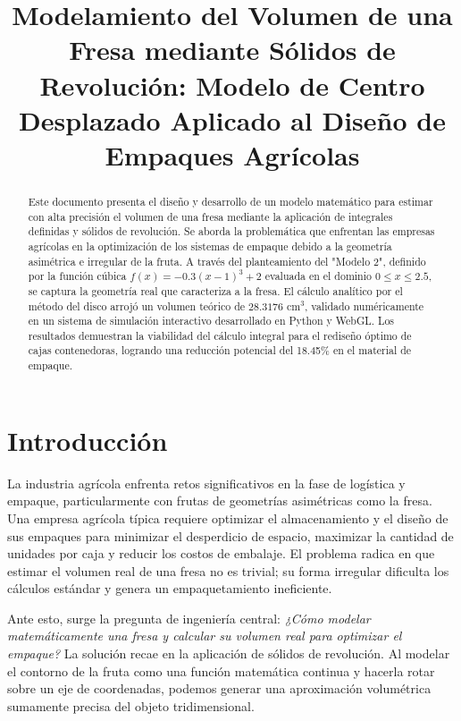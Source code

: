 \documentclass[conference, Spanish]{IEEEtran}
\begin{document}
\title{Modelamiento del Volumen de una Fresa mediante Sólidos de Revolución: Modelo de Centro Desplazado Aplicado al Diseño de Empaques Agrícolas}

\author{
}

\maketitle

\begin{abstract}
Este documento presenta el diseño y desarrollo de un modelo matemático para estimar con alta precisión el volumen de una fresa mediante la aplicación de integrales definidas y sólidos de revolución. Se aborda la problemática que enfrentan las empresas agrícolas en la optimización de los sistemas de empaque debido a la geometría asimétrica e irregular de la fruta. A través del planteamiento del "Modelo 2", definido por la función cúbica $f(x) = -0.3(x-1)^3 + 2$ evaluada en el dominio $0 \le x \le 2.5$, se captura la geometría real que caracteriza a la fresa. El cálculo analítico por el método del disco arrojó un volumen teórico de $28.3176$ cm$^3$, validado numéricamente en un sistema de simulación interactivo desarrollado en Python y WebGL. Los resultados demuestran la viabilidad del cálculo integral para el rediseño óptimo de cajas contenedoras, logrando una reducción potencial del 18.45\% en el material de empaque.
\end{abstract}

\section{Introducción}
La industria agrícola enfrenta retos significativos en la fase de logística y empaque, particularmente con frutas de geometrías asimétricas como la fresa. Una empresa agrícola típica requiere optimizar el almacenamiento y el diseño de sus empaques para minimizar el desperdicio de espacio, maximizar la cantidad de unidades por caja y reducir los costos de embalaje. El problema radica en que estimar el volumen real de una fresa no es trivial; su forma irregular dificulta los cálculos estándar y genera un empaquetamiento ineficiente.

Ante esto, surge la pregunta de ingeniería central: \textit{¿Cómo modelar matemáticamente una fresa y calcular su volumen real para optimizar el empaque?} La solución recae en la aplicación de sólidos de revolución. Al modelar el contorno de la fruta como una función matemática continua y hacerla rotar sobre un eje de coordenadas, podemos generar una aproximación volumétrica sumamente precisa del objeto tridimensional.
\end{document}
